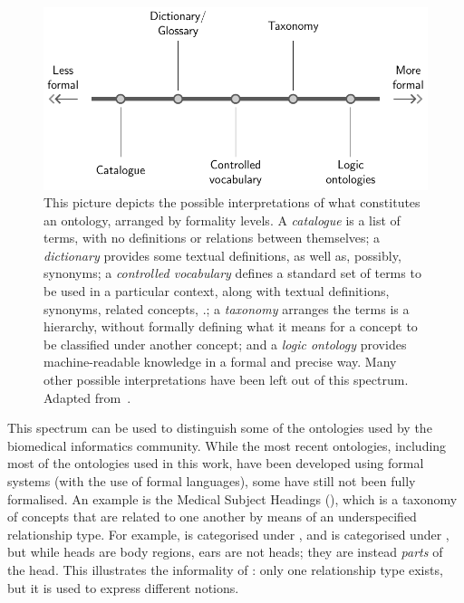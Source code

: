 \begin{figure}
    \centering
    \includegraphics{images/spectrum.pdf}
    \caption[The spectrum of ontology formality]{This picture depicts the possible interpretations of what constitutes an ontology, arranged by formality levels. A \emph{catalogue} is a list of terms, with no definitions or relations between themselves; a \emph{dictionary} provides some textual definitions, as well as, possibly, synonyms; a \emph{controlled vocabulary} defines a standard set of terms to be used in a particular context, along with textual definitions, synonyms, related concepts, \etc.; a \emph{taxonomy} arranges the terms is a hierarchy, without formally defining what it means for a concept to be classified under another concept; and a \emph{logic ontology} provides machine-readable knowledge in a formal and precise way. Many other possible interpretations have been left out of this spectrum. Adapted from~\citep{McGuinness2002}.}
    \label{fig:spectrum}
\end{figure}

This spectrum can be used to distinguish some of the ontologies used by the biomedical informatics community. While the most recent ontologies, including most of the ontologies used in this work, have been developed using formal systems (\ie with the use of formal languages), some have still not been fully formalised. An example is the Medical Subject Headings (), which is a taxonomy of concepts that are related to one another by means of an underspecified relationship type. For example,  is categorised under , and  is categorised under , but while heads are body regions, ears are not heads; they are instead \emph{parts} of the head. This illustrates the informality of : only one relationship type exists, but it is used to express different notions.


